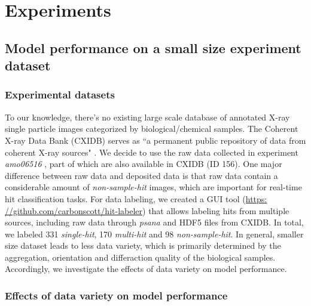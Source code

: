\section{Experiments}

\subsection{Model performance on a small size experiment dataset}

\subsubsection{Experimental datasets}

To our knowledge, there's no existing large scale database of annotated X-ray
single particle images categorized by biological/chemical samples.  The Coherent
X-ray Data Bank (CXIDB) serves as ``a permanent public repository of data from
coherent X-ray sources" \cite{maiaCoherentXrayImaging2012}.  We decide to use
the raw data collected in experiment \textit{amo06516}
\cite{liDiffractionDataAerosolized2020}, part of which are also available in
CXIDB (ID 156).  One major difference between raw data and deposited data is
that raw data contain a considerable amount of \textit{non-sample-hit} images,
which are important for real-time hit classification tasks.  For data labeling,
we created a GUI tool (\url{https:
//github.com/carbonscott/hit-labeler}) that allows labeling hits from multiple
 sources, including raw data through \textit{psana}
 \cite{damianiLinacCoherentLight2016} and HDF5 files from CXIDB.  In total, we
 labeled 331 \textit{single-hit}, 170 \textit{multi-hit} and 98
 \textit{non-sample-hit}.  In general, smaller size dataset leads to less data
 variety, which is primarily determined by the aggregation, orientation and
 differaction quality of the biological samples.  Accordingly, we investigate
 the effects of data variety on model performance.  


\subsubsection{Effects of data variety on model performance}

